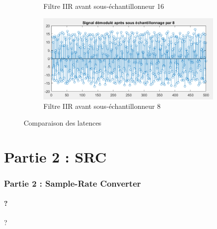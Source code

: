 \documentclass[
10pt,
aspectratio=169,
]{beamer}
\begin{document}
\begin{frame}
\begin{figure}
\begin{subfigure}{0.4\textwidth}
    \caption{Filtre IIR avant sous-échantillonneur 16}
    \label{fig:cheb2}
\end{subfigure}
\begin{subfigure}{0.4\textwidth}
    \includegraphics[scale=0.3]{Images/lat_IIR_8.PNG}
    \caption{Filtre IIR avant sous-échantillonneur 8}
    \label{fig:ell}
\end{subfigure}
        
\caption{Comparaison des latences}
\label{fig:phases}
\end{figure}
\end{frame}

\section{Partie 2 : SRC}
\begin{frame} 
\frametitle{Partie 2 : Sample-Rate Converter} 
\framesubtitle{?} 
?
\end{frame}
\end{document}
